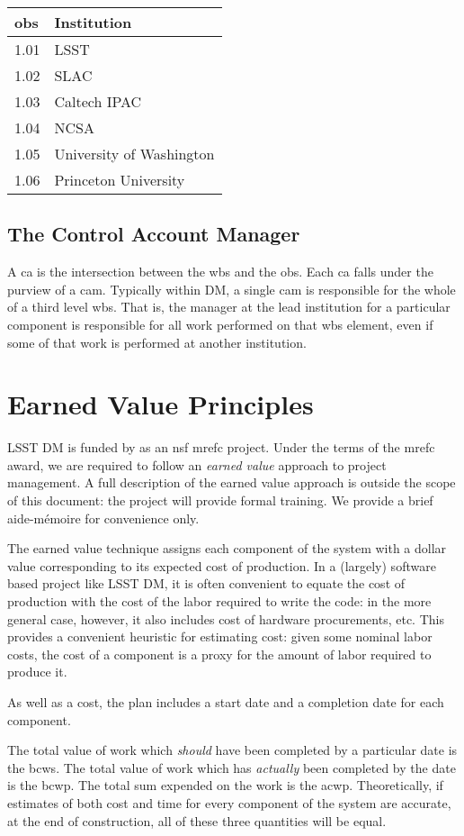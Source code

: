 \begin{longtable}[]{@{}ll@{}}
\hline
\gls{obs} & Institution\tabularnewline
\hline
\endhead
1.01 & LSST\tabularnewline
1.02 & SLAC\tabularnewline
1.03 & Caltech IPAC\tabularnewline
1.04 & NCSA\tabularnewline
1.05 & University of Washington\tabularnewline
1.06 & Princeton University\tabularnewline
\hline
\end{longtable}

\subsection{The Control Account Manager}
\label{sec:cam}

A \gls{ca} is the intersection between the \gls{wbs} and the \gls{obs}.
Each \gls{ca} falls under the purview of a \gls{cam}.
Typically within DM, a single \gls{cam} is responsible for the whole of a third level \gls{wbs}.
That is, the manager at the lead institution for a particular component is responsible for all work performed on that \gls{wbs} \gls{element}, even if some of that work is performed at another institution.

\section{Earned Value Principles}
\label{sec:evms}

LSST DM is funded by as an \gls{nsf} \gls{mrefc} project.
Under the terms of the \gls{mrefc} award, we are required to follow an \emph{earned value} approach to project management.
A full description of the earned value approach is outside the scope of this document: the project will provide formal training.
We provide a brief aide-m\'emoire for convenience only.

The earned value technique assigns each component of the system with a
dollar value corresponding to its expected cost of production. In a
(largely) software based project like LSST DM, it is often convenient to
equate the cost of production with the cost of the labor required to
write the code: in the more general case, however, it also includes cost
of hardware procurements, etc. This provides a convenient heuristic for
estimating cost: given some nominal labor costs, the cost of a component
is a proxy for the amount of labor required to produce it.

As well as a cost, the plan includes a start date and a completion date
for each component.

The total value of work which \emph{should} have been completed by a particular date is the \gls{bcws}.
The total value of work which has \emph{actually} been completed by the date is the \gls{bcwp}.
The total sum expended on the work is the \gls{acwp}.
Theoretically, if estimates of both cost and time for every component of the system are accurate, at the end of construction, all of these three quantities will be equal.

